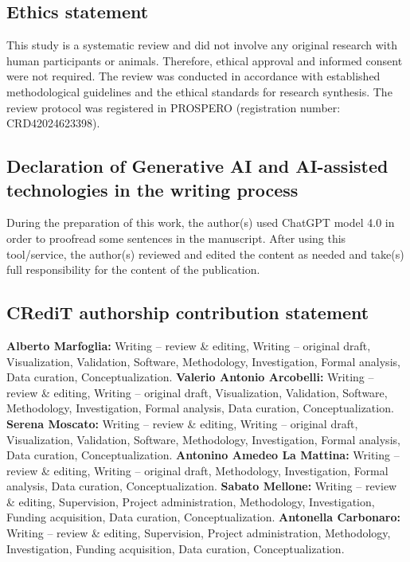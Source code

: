 \subsection*{Ethics statement}

This study is a systematic review and did not involve any original research with human participants or animals. Therefore, ethical approval and informed consent were not required. The review was conducted in accordance with established methodological guidelines and the ethical standards for research synthesis. The review protocol was registered in PROSPERO (registration number: CRD42024623398).

\subsection*{Declaration of Generative AI and AI-assisted technologies in the writing process}

During the preparation of this work, the author(s) used ChatGPT model 4.0 in order to proofread some sentences in the manuscript. After using this tool/service, the author(s) reviewed and edited the content as needed and take(s) full responsibility for the content of the publication.

\subsection*{CRediT authorship contribution statement}

\textbf{Alberto Marfoglia:} Writing -- review \& editing, Writing -- original draft, Visualization, Validation, Software, Methodology, Investigation, Formal analysis, Data curation, Conceptualization. \textbf{Valerio Antonio Arcobelli:} Writing -- review \& editing, Writing -- original draft, Visualization, Validation, Software, Methodology, Investigation, Formal analysis, Data curation, Conceptualization. \textbf{Serena Moscato:} Writing -- review \& editing, Writing -- original draft, Visualization, Validation, Software, Methodology, Investigation, Formal analysis, Data curation, Conceptualization. \textbf{Antonino Amedeo La Mattina:} Writing -- review \& editing, Writing -- original draft, Methodology, Investigation, Formal analysis, Data curation, Conceptualization. \textbf{Sabato Mellone:} Writing -- review \& editing, Supervision, Project administration, Methodology, Investigation, Funding acquisition, Data curation, Conceptualization. \textbf{Antonella Carbonaro:} Writing -- review \& editing, Supervision, Project administration, Methodology, Investigation, Funding acquisition, Data curation, Conceptualization.

